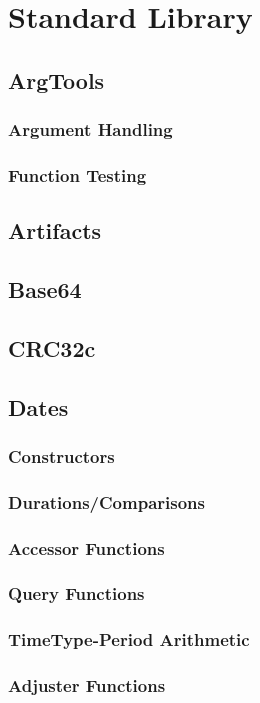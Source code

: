 \part{Standard Library}
  \chapter{ArgTools}
    \section{Argument Handling}
    \section{Function Testing}
  \chapter{Artifacts}
  \chapter{Base64}
  \chapter{CRC32c}
  \chapter{Dates}
    \section{Constructors}
    \section{Durations/Comparisons}
    \section{Accessor Functions}
    \section{Query Functions}
    \section{TimeType-Period Arithmetic}
    \section{Adjuster Functions}
